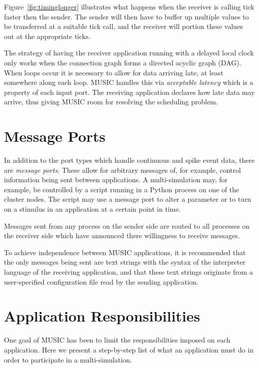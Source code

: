 \documentclass[a4paper]{report}
\begin{document}
Figure~\ref{fig:timinglonger} illustrates what happens when the
receiver is calling tick faster then the sender.  The sender will then
have to buffer up multiple values to be transferred at a suitable tick
call, and the receiver will portion these values out at the
appropriate ticks.

The strategy of having the receiver application running with a delayed
local clock only works when the connection graph forms a directed
acyclic graph (DAG).
When loops occur it is necessary to allow for data arriving late, at
least somewhere along each loop.  MUSIC handles this via
\emph{acceptable latency}
which is a property of each input port.  The receiving application
declares how late data may arrive, thus giving MUSIC room for
resolving the scheduling problem.


\section{Message Ports}

In addition to the port types which handle continuous and spike event
data, there are \emph{message ports}.  These allow for arbitrary
messages of, for example, control information being sent between
applications.  A multi-simulation may, for example, be controlled by a
script running in a Python process on one of the cluster nodes.  The
script may use a message port to alter a parameter or to turn on a
stimulus in an application at a certain point in time.

Messages sent from any process on the sender side are routed to all
processes on the receiver side which have announced there willingness
to receive messages.

To achieve independence between MUSIC applications, it is recommended
that the only messages being sent are text strings with the syntax of
the interpreter language of the receiving application, and that these
text strings originate from a user-specified configuration file read
by the sending application.


\section{Application Responsibilities}

One goal of MUSIC has been to limit the responsibilities imposed on
each application.  Here we present a step-by-step list of what an
application must do in order to participate in a multi-simulation.
\end{document}
